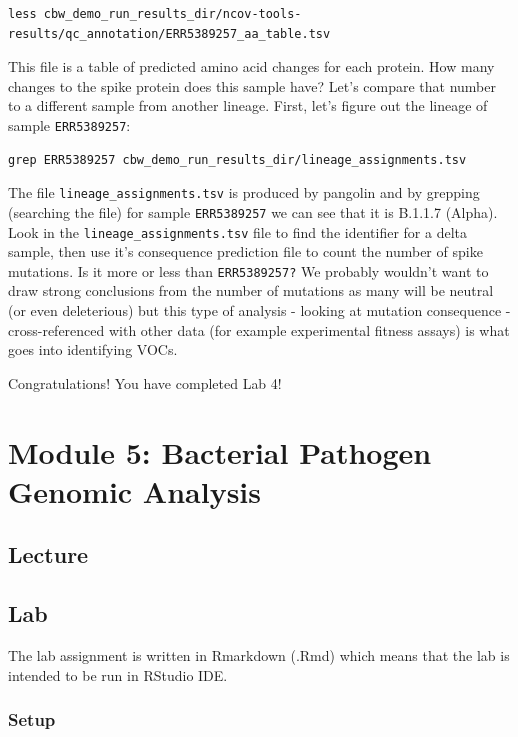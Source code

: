 \documentclass[
]{book}
\begin{document}
\begin{verbatim}
less cbw_demo_run_results_dir/ncov-tools-results/qc_annotation/ERR5389257_aa_table.tsv
\end{verbatim}

This file is a table of predicted amino acid changes for each protein. How many changes to the spike protein does this sample have? Let's compare that number to a different sample from another lineage. First, let's figure out the lineage of sample \texttt{ERR5389257}:

\begin{verbatim}
grep ERR5389257 cbw_demo_run_results_dir/lineage_assignments.tsv
\end{verbatim}

The file \texttt{lineage\_assignments.tsv} is produced by pangolin and by grepping (searching the file) for sample \texttt{ERR5389257} we can see that it is B.1.1.7 (Alpha). Look in the \texttt{lineage\_assignments.tsv} file to find the identifier for a delta sample, then use it's consequence prediction file to count the number of spike mutations. Is it more or less than \texttt{ERR5389257?} We probably wouldn't want to draw strong conclusions from the number of mutations as many will be neutral (or even deleterious) but this type of analysis - looking at mutation consequence - cross-referenced with other data (for example experimental fitness assays) is what goes into identifying VOCs.

Congratulations! You have completed Lab 4!

\chapter{Module 5: Bacterial Pathogen Genomic Analysis}\label{module-5-bacterial-pathogen-genomic-analysis}

\section{Lecture}\label{lecture-4}

\section{Lab}\label{lab-2}

The lab assignment is written in Rmarkdown (.Rmd) which means that the lab is intended to be run in RStudio IDE.

\subsection{Setup}\label{setup}
\end{document}
